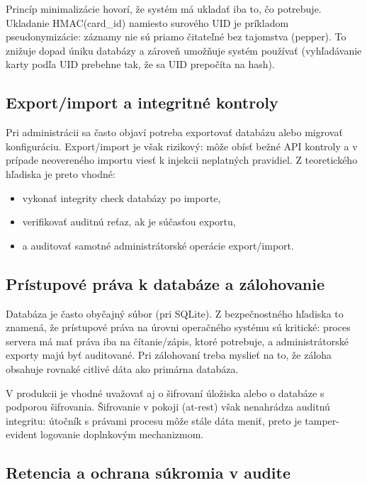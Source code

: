 \documentclass[journal,a4paper,onecolumn]{IEEEtran}
\begin{document}
Princíp minimalizácie hovorí, že systém má ukladať iba to, čo potrebuje. Ukladanie HMAC(card\_id) namiesto surového UID je príkladom pseudonymizácie: záznamy nie sú priamo čitateľné bez tajomstva (pepper). To znižuje dopad úniku databázy a zároveň umožňuje systém používať (vyhľadávanie karty podľa UID prebehne tak, že sa UID prepočíta na hash).

\subsection{Export/import a integritné kontroly}

Pri administrácii sa často objaví potreba exportovať databázu alebo migrovať konfiguráciu. Export/import je však rizikový: môže obísť bežné API kontroly a v prípade neovereného importu viesť k injekcii neplatných pravidiel. Z teoretického hľadiska je preto vhodné:

\begin{itemize}[leftmargin=*,itemsep=2pt]
  \item vykonať integrity check databázy po importe,
  \item verifikovať auditnú reťaz, ak je súčasťou exportu,
  \item a auditovať samotné administrátorské operácie export/import.
\end{itemize}

\subsection{Prístupové práva k databáze a zálohovanie}

Databáza je často obyčajný súbor (pri SQLite). Z bezpečnostného hľadiska to znamená, že prístupové práva na úrovni operačného systému sú kritické: proces servera má mať práva iba na čítanie/zápis, ktoré potrebuje, a administrátorské exporty majú byť auditované. Pri zálohovaní treba myslieť na to, že záloha obsahuje rovnaké citlivé dáta ako primárna databáza.

V produkcii je vhodné uvažovať aj o šifrovaní úložiska alebo o databáze s podporou šifrovania. Šifrovanie v pokoji (at-rest) však nenahrádza auditnú integritu: útočník s právami procesu môže stále dáta meniť, preto je tamper-evident logovanie doplnkovým mechanizmom.


\subsection{Retencia a ochrana súkromia v audite}
\end{document}
